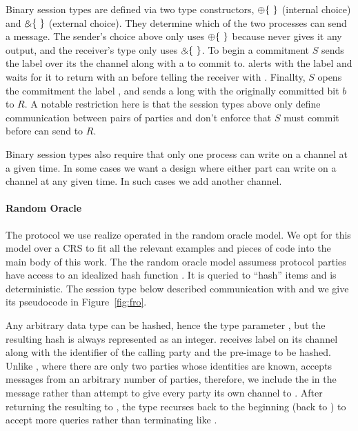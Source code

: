 Binary session types are defined via two type constructors, $\ichoice$ (internal choice) and $\echoice$ (external choice). 
They determine which of the two processes can send a message.
The sender's choice above only uses $\ichoice$ because \Fcom never gives it any output, and the receiver's type only uses $\echoice$.
To begin a commitment $S$ sends the label  over its the channel along with a  to commit to.
\Fcom alerts \A with the label  and waits for it to return with an  before telling the receiver with .
Finallty, $S$ opens the commitment the label , and \Fcom sends  a long with the originally committed bit $b$ to $R$.
A notable restriction here is that the session types above only define communication between pairs of parties and don't enforce that $S$ must commit before \Fcom can send  to $R$.

Binary session types also require that only one process can write on a channel at a given time. 
In some cases we want a design where either part can write on a channel at any given time. In such cases we add another channel.



\paragraph{Random Oracle}
The protocol we use realize \Fcom operated in the random oracle model. 
We opt for this model over a CRS to fit all the relevant examples and pieces of code into the main body of this work.
The the random oracle model assumess protocol parties have access to an idealized hash function \Fro.
It is queried to ``hash'' items and is deterministic. 
The session type below described communication with \Fro and we give its pseudocode in Figure~\ref{fig:fro}.


Any arbitrary data type can be hashed, hence the type parameter , but the resulting hash is always represented as an integer. 
\Fro receives label  on its channel along with the identifier of the calling party and the pre-image to be hashed. 
Unlike \Fcom, where there are only two parties whose identities are known, \Fro accepts messages from an arbitrary number of parties, therefore, we include the  in the message rather than attempt to give every party its own channel to \Fro.
After returning the resulting  to , the type recurses back to the beginning (back to ) to accept more queries rather than terminating like \Fcom.

